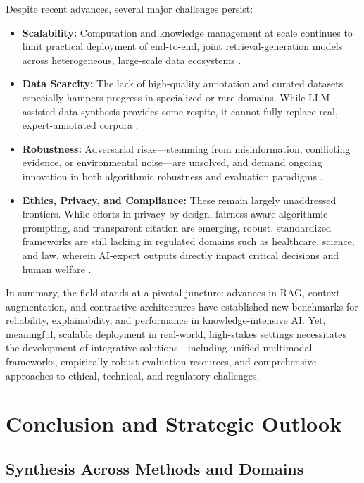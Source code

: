 \documentclass[sigconf]{acmart}
\begin{document}
Despite recent advances, several major challenges persist:
\begin{itemize}
    \item \textbf{Scalability:} Computation and knowledge management at scale continues to limit practical deployment of end-to-end, joint retrieval-generation models across heterogeneous, large-scale data ecosystems \cite{ref1,ref4,ref7,ref10,ref21,ref29,ref38,ref46,ref49,ref51,ref52,ref54,ref61,ref62}.
    \item \textbf{Data Scarcity:} The lack of high-quality annotation and curated datasets especially hampers progress in specialized or rare domains. While LLM-assisted data synthesis provides some respite, it cannot fully replace real, expert-annotated corpora \cite{ref8,ref16,ref19,ref22,ref26,ref28,ref31,ref34,ref36}.
    \item \textbf{Robustness:} Adversarial risks—stemming from misinformation, conflicting evidence, or environmental noise—are unsolved, and demand ongoing innovation in both algorithmic robustness and evaluation paradigms \cite{ref2,ref3,ref7,ref37,ref39,ref49,ref51,ref54}.
    \item \textbf{Ethics, Privacy, and Compliance:} These remain largely unaddressed frontiers. While efforts in privacy-by-design, fairness-aware algorithmic prompting, and transparent citation are emerging, robust, standardized frameworks are still lacking in regulated domains such as healthcare, science, and law, wherein AI-expert outputs directly impact critical decisions and human welfare \cite{ref6,ref13,ref23,ref30,ref37,ref45,ref55,ref62,ref63}.
\end{itemize}

In summary, the field stands at a pivotal juncture: advances in RAG, context augmentation, and contrastive architectures have established new benchmarks for reliability, explainability, and performance in knowledge-intensive AI. Yet, meaningful, scalable deployment in real-world, high-stakes settings necessitates the development of integrative solutions—including unified multimodal frameworks, empirically robust evaluation resources, and comprehensive approaches to ethical, technical, and regulatory challenges.

\section{Conclusion and Strategic Outlook}

\subsection{Synthesis Across Methods and Domains}
\end{document}
